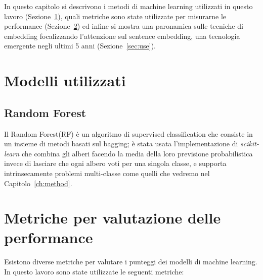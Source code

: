 In questo capitolo si descrivono i metodi di machine learning utilizzati in questo lavoro (Sezione~\ref{sec:models}), quali metriche sono state utilizzate per misurarne le performance (Sezione~\ref{metrics}) ed infine si mostra una paronamica sulle tecniche di embedding focalizzando l'attenzione sul sentence embedding, una tecnologia emergente negli ultimi 5 anni (Sezione~\ref{sec:use}).

\section{Modelli utilizzati}
\label{sec:models}
\subsection{Random Forest}
\label{ssec:RF}
Il Random Forest(RF) è un algoritmo di supervised classification che consiste in un insieme di metodi basati sul bagging\cite{Random Forest}; è stata usata l'implementazione di \textit{scikit-learn} che combina gli alberi facendo la media della loro previsione probabilistica invece di lasciare che ogni albero voti per una singola classe, e supporta intrinsecamente problemi multi-classe come quelli che vedremo nel Capitolo~\ref{ch:method}.


\section{Metriche per valutazione delle performance}
\label{metrics}
Esistono diverse metriche per valutare i punteggi dei modelli di machine learning. In questo lavoro sono state utilizzate le seguenti metriche:

